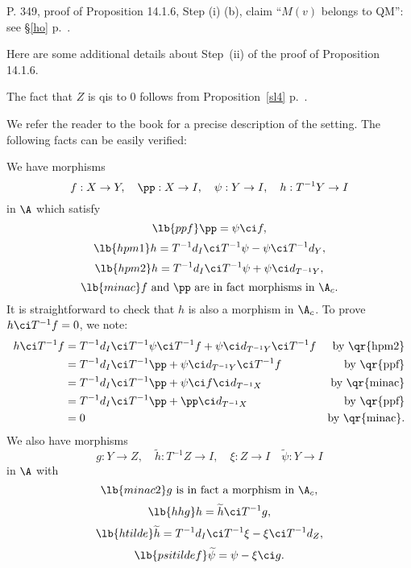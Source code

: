 \documentclass[12pt]{article}
\theoremstyle{remark}
\theoremstyle{definition}
\begin{document}
%

\begin{s}
P. 349, proof of Proposition 14.1.6, Step (i) (b), claim ``$M(v)$ belongs to QM'': see \S\ref{ho} p.~.
\end{s}



Here are some additional details about Step~(ii) of the proof of Proposition 14.1.6. 

The fact that $Z$ is qis to 0 follows from Proposition~\ref{sl4} p.~.

We refer the reader to the book for a precise description of the setting. The following facts can be easily verified: 

We have morphisms 
$$
f:X\to Y,\quad\pp:X\to I,\quad\psi:Y\to I,\quad h:T^{-1}Y\to I%
$$ 
in $\A$ which satisfy 
\begin{equation}\lb{ppf}
\pp=\psi\ci f,
\end{equation} 
\begin{equation}\lb{hpm1}
h=T^{-1}d_I\ci T^{-1}\psi-\psi\ci T^{-1}d_Y,
\end{equation} 
\begin{equation}\lb{hpm2}
h=T^{-1}d_I\ci T^{-1}\psi+\psi\ci d_{T^{-1}Y},
\end{equation} 
\begin{equation}\lb{minac}
f\text{ and }\pp%
\text{ are in fact morphisms in }\A_c.
\end{equation}
It is straightforward to check that $h$ is also a morphism in $\A_c$. To prove $h\ci T^{-1}f=0$, we note: 
\begin{align*}
h\ci T^{-1}f&=T^{-1}d_I\ci T^{-1}\psi\ci T^{-1}f+\psi\ci d_{T^{-1}Y}\ci T^{-1}f&\text{by \qr{hpm2}}\\ 
&=T^{-1}d_I\ci T^{-1}\pp+\psi\ci d_{T^{-1}Y}\ci T^{-1}f&\text{by \qr{ppf}}\\ 
&=T^{-1}d_I\ci T^{-1}\pp+\psi\ci f\ci d_{T^{-1}X}&\text{by \qr{minac}}\\ 
&=T^{-1}d_I\ci T^{-1}\pp+\pp\ci d_{T^{-1}X}&\text{by \qr{ppf}}\\ 
&=0&\text{by \qr{minac}}. 
\end{align*}
We also have morphisms 
$$
g:Y\to Z,\quad\widetilde h:T^{-1}Z\to I,\quad\xi:Z\to I\quad\widetilde\psi:Y\to I
$$ 
in $\A$ with 
\begin{equation}\lb{minac2}
g\text{ is in fact a morphism in }\A_c,
\end{equation} 
\begin{equation}\lb{hhg}
h=\widetilde h\ci T^{-1}g,
\end{equation} 
\begin{equation}\lb{htilde}
\widetilde h=T^{-1}d_I\ci T^{-1}\xi-\xi\ci T^{-1}d_Z,
\end{equation} 
\begin{equation}\lb{psitildef}
\widetilde\psi=\psi-\xi\ci g. 
\end{equation}
\end{document}
